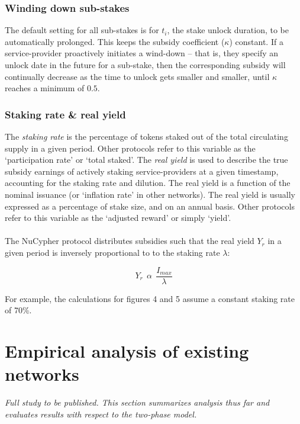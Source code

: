 \documentclass[longbibliography,nofootinbib]{revtex4-1}
\begin{document}
\subsubsection{Winding down sub-stakes}

The default setting for all sub-stakes is for $t_i$, the stake unlock duration, to be automatically prolonged. This keeps the subsidy coefficient ($\kappa$) constant. If a service-provider proactively initiates a wind-down – that is, they specify an unlock date in the future for a sub-stake, then the corresponding subsidy will continually decrease as the time to unlock gets smaller and smaller, until $\kappa$ reaches a minimum of $0.5$.

\subsubsection{Staking rate \& real yield}

The \textit{staking rate} is the percentage of tokens staked out of the total circulating supply in a given period. Other protocols refer to this variable as the `participation rate' or `total staked'. The \textit{real yield} is used to describe the true subsidy earnings of actively staking service-providers at a given timestamp, accounting for the staking rate and dilution. The real yield is a function of the nominal issuance (or `inflation rate' in other networks). The real yield is usually expressed as a percentage of stake size, and on an annual basis. Other protocols refer to this variable as the `adjusted reward' or simply `yield'. 
\\\\
The NuCypher protocol distributes subsidies such that the real yield $Y_r$ in a given period is inversely proportional to to the staking rate $\lambda$: 

\begin{equation}
    Y_r \:\:\alpha\:\: \frac{I_{max}}{\lambda}
\end{equation}

For example, the calculations for figures 4 and 5 assume a constant staking rate of 70\%.

\section{Empirical analysis of existing networks}

\textit{Full study to be published. This section summarizes analysis thus far and evaluates results with respect to the two-phase model.}
\end{document}
